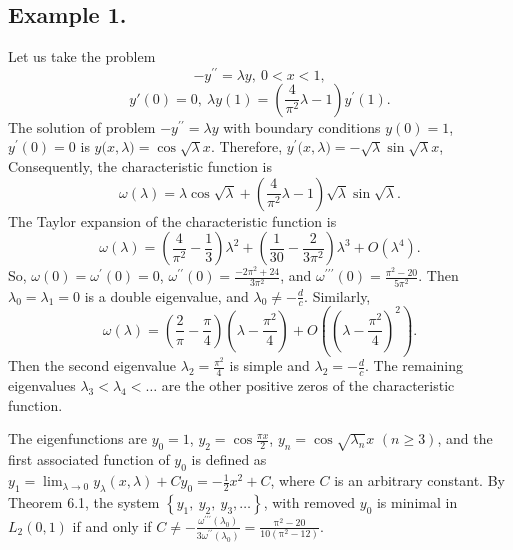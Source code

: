 \documentclass[10pt,a4paper]{amsart}
\numberwithin{equation}{section}
\begin{document}
\subsection*{Example 1.}Let us take the problem  
$$
-y^{\prime \prime }=\lambda y,\ 0<x<1,
$$
$$
y'(0)=0,\ 
{\lambda}y(1)=\left(\frac{4}{\pi^2}{\lambda }-1\right)y^{\prime }(1).
$$
The solution of problem $-y^{\prime \prime }=\lambda y$ with boundary conditions $y(0)=1$, $y^\prime(0)=0$ is $y({x,\lambda)}=\cos{\sqrt{\lambda}x}$. Therefore, $y^\prime({x,\lambda)}=-{\sqrt{\lambda}}\sin{\sqrt{\lambda}x}$, Consequently, the characteristic function is$$\omega(\lambda) = {\lambda}\cos{\sqrt{\lambda}}+\left(\frac{4}{\pi^2}{\lambda }-1\right){\sqrt{\lambda}}\sin{\sqrt{\lambda}}.
$$
The Taylor expansion of the characteristic function is \[\omega(\lambda) =  \left(\frac{4}{\pi^2} - \frac{1}{3}\right)\lambda^2 + \left(\frac{1}{30} - \frac{2}{3\pi^2}\right)\lambda^3 + O(\lambda^4).\]
So, $\omega(0)=\omega^\prime(0)=0$, $\omega^{\prime\prime}(0)=\frac{-2 \pi^{2}+24}{3 \pi^{2}}$, and $\omega^{\prime\prime\prime}(0)=\frac{\pi^{2}-20}{5 \pi^{2}}$.
Then
$\lambda _{0}=\lambda _{1}=0$ is a double eigenvalue, and $\lambda _{0}\neq-\frac{d}{c}$. Similarly,
$$\omega(\lambda) = \left(\frac{2}{\pi} - \frac{\pi}{4}\right)\left(\lambda - \frac{\pi^2}{4}\right) +  O\left(\left(\lambda - \frac{\pi^2}{4}\right)^2\right).$$
Then the second eigenvalue $\lambda _{2}=\frac{\pi^2}{4}$ is simple and $\lambda _{2}=-\frac{d}{c}$. The remaining eigenvalues $\lambda _{3}<\lambda _{4}<\ldots$ are the other positive zeros  of the characteristic function.

The eigenfunctions are $y_{0}=1$, $y_{2}=\cos{\frac{\pi x}{2}}$, $y_{n}=\cos{\sqrt{\lambda _{n}}x}$ $(n\ge 3)$, and the first associated function of $y_{0}$ is defined as $y_{1}=\lim_{\lambda\to 0}y_\lambda(x,\lambda)+Cy_0=-\frac{1}{2}x^2+C$, where $C$ is
an arbitrary constant.
By Theorem 6.1,
the system $\left\{ y_{1},\ y_{2},\ y_{3},\ldots\right\}$,  with removed $y_{0}$ is minimal in $L_2(0,1)$ if and only if $C\ne-\frac{\omega^{\prime\prime\prime}(\lambda_0)}{3\omega^{\prime\prime}(\lambda_0)}=\frac{\mathrm{\pi}^{2}-20}{10 \left(\mathrm{\pi}^{2}-12\right)}$.
\end{document}
